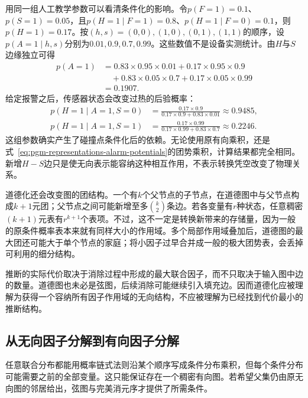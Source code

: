用同一组人工教学参数可以看清条件化的影响。令$p(F=1)=0.1$、$p(S=1)=0.05$，且$p(H=1\mid F=1)=0.8$、$p(H=1\mid F=0)=0.1$，则$p(H=1)=0.17$。按$(h,s)=(0,0),(1,0),(0,1),(1,1)$的顺序，设$p(A=1\mid h,s)$分别为$0.01,0.9,0.7,0.99$。这些数值不是设备实测统计。由$H$与$S$边缘独立可得
\[
  \begin{aligned}
    p(A=1)
    &=0.83\times0.95\times0.01
      +0.17\times0.95\times0.9\\
    &\quad+0.83\times0.05\times0.7
      +0.17\times0.05\times0.99\\
    &=0.1907.
  \end{aligned}
\]
给定报警之后，传感器状态会改变过热的后验概率：
\begin{equation}
  \begin{aligned}
    p(H=1\mid A=1,S=0)
    &=\frac{0.17\times0.9}
    {0.17\times0.9+0.83\times0.01}
    \approx0.9485,\\
    p(H=1\mid A=1,S=1)
    &=\frac{0.17\times0.99}
    {0.17\times0.99+0.83\times0.7}
    \approx0.2246.
  \end{aligned}
  \label{eq:pgm-representations-alarm-posteriors}
\end{equation}
这组参数确实产生了碰撞点条件化后的依赖。无论使用原有向乘积，还是式~\eqref{eq:pgm-representations-alarm-potentials}的团势乘积，计算结果都完全相同。新增$H-S$边只是使无向表示能容纳这种相互作用，不表示转换凭空改变了物理关系。

道德化还会改变图的团结构。一个有$k$个父节点的子节点，在道德图中与父节点构成$k+1$元团；父节点之间可能新增至多$\binom{k}{2}$条边。若各变量有$r$种状态，任意稠密$(k+1)$元表有$r^{k+1}$个表项。不过，这不一定是转换新带来的存储量，因为一般的原条件概率表本来就有同样大小的作用域。多个局部作用域叠加后，道德图的最大团还可能大于单个节点的家庭；将小因子过早合并成一般的极大团势表，会丢掉可利用的细分结构。

推断的实际代价取决于消除过程中形成的最大联合因子，而不只取决于输入图中边的数量。道德图也未必是弦图，后续消除可能继续引入填充边。因而道德化应被理解为获得一个容纳所有因子作用域的无向结构，不应被理解为已经找到代价最小的推断结构。

\subsection{从无向因子分解到有向因子分解}
\label{sec:pgm-representations-undirected-to-directed}

任意联合分布都能用概率链式法则沿某个顺序写成条件分布乘积，但每个条件分布可能需要之前的全部变量。这只能保证存在一个稠密有向图。若希望父集仍由原无向图的邻居给出，弦图与完美消元序才提供了所需条件。

